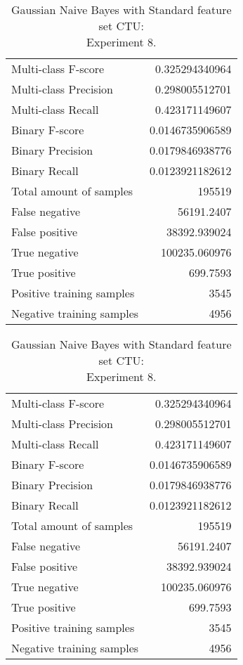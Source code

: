 \begin{table}[H]
\begin{minipage}{0.5\textwidth}
\caption{Gaussian Naive Bayes with Standard feature set CTU: \\Experiment 7.}
\centering
\begin{tabular}{l r}
\toprule
Multi-class F-score & 0.325294340964 \\
Multi-class Precision & 0.298005512701 \\
Multi-class Recall & 0.423171149607 \\
\midrule
Binary F-score & 0.0146735906589 \\
Binary Precision & 0.0179846938776 \\
Binary Recall & 0.0123921182612 \\
\midrule
Total amount of samples & 195519 \\
False negative & 56191.2407 \\
False positive & 38392.939024 \\
True negative & 100235.060976 \\
True positive & 699.7593 \\
\midrule
Positive training samples & 3545 \\
Negative training samples & 4956 \\
\bottomrule
\end{tabular}
\end{minipage}
\hfillx
\begin{minipage}{0.5\textwidth}
\caption{Gaussian Naive Bayes with Standard feature set CTU: \\Experiment 8.}
\centering
\begin{tabular}{l r}
\toprule
Multi-class F-score & 0.325294340964 \\
Multi-class Precision & 0.298005512701 \\
Multi-class Recall & 0.423171149607 \\
\midrule
Binary F-score & 0.0146735906589 \\
Binary Precision & 0.0179846938776 \\
Binary Recall & 0.0123921182612 \\
\midrule
Total amount of samples & 195519 \\
False negative & 56191.2407 \\
False positive & 38392.939024 \\
True negative & 100235.060976 \\
True positive & 699.7593 \\
\midrule
Positive training samples & 3545 \\
Negative training samples & 4956 \\
\bottomrule
\end{tabular}
\end{minipage}
\end{table}
